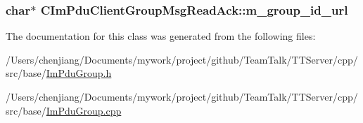 \subsubsection[{m\+\_\+group\+\_\+id\+\_\+url}]{\setlength{\rightskip}{0pt plus 5cm}char$\ast$ C\+Im\+Pdu\+Client\+Group\+Msg\+Read\+Ack\+::m\+\_\+group\+\_\+id\+\_\+url\hspace{0.3cm}{\ttfamily [private]}}\label{class_c_im_pdu_client_group_msg_read_ack_a07a5c1d8a3b2f98d46046d2e31578eef}


The documentation for this class was generated from the following files\+:\begin{DoxyCompactItemize}
\item 
/\+Users/chenjiang/\+Documents/mywork/project/github/\+Team\+Talk/\+T\+T\+Server/cpp/src/base/\hyperlink{_im_pdu_group_8h}{Im\+Pdu\+Group.\+h}\item 
/\+Users/chenjiang/\+Documents/mywork/project/github/\+Team\+Talk/\+T\+T\+Server/cpp/src/base/\hyperlink{_im_pdu_group_8cpp}{Im\+Pdu\+Group.\+cpp}\end{DoxyCompactItemize}
